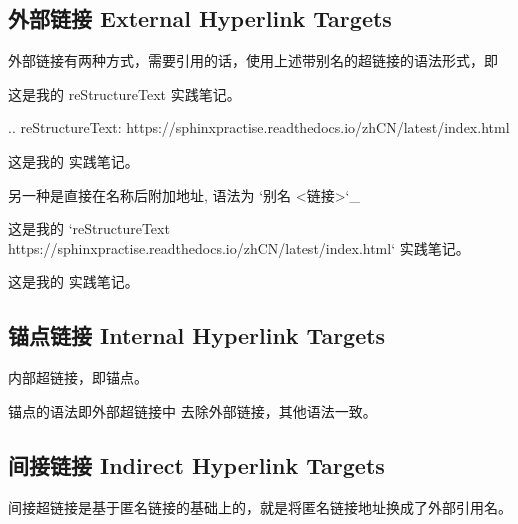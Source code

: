 \documentclass[a4paper,10pt,english]{sphinxmanual}
\begin{document}
\subsection{外部链接 External Hyperlink Targets}
\label{\detokenize{reStructureText_syntax:external-hyperlink-targets}}
\sphinxAtStartPar
外部链接有两种方式，需要引用的话，使用上述带别名的超链接的语法形式，即

\sphinxAtStartPar
{}

\begin{sphinxVerbatim}[commandchars=\\\{\}]
这是我的 reStructureText\PYGZus{} 实践笔记。

.. \PYGZus{}reStructureText: https://sphinx\PYGZhy{}practise.readthedocs.io/zh\PYGZus{}CN/latest/index.html
\end{sphinxVerbatim}

\sphinxAtStartPar
{}

\sphinxAtStartPar
这是我的  实践笔记。

\sphinxAtStartPar
另一种是直接在名称后附加地址, 语法为 `别名 <链接>`\_

\sphinxAtStartPar
{}

\begin{sphinxVerbatim}[commandchars=\\\{\}]
这是我的 `reStructureText \PYGZlt{}https://sphinx\PYGZhy{}practise.readthedocs.io/zh\PYGZus{}CN/latest/index.html\PYGZgt{}`\PYGZus{} 实践笔记。
\end{sphinxVerbatim}

\sphinxAtStartPar
{}

\sphinxAtStartPar
这是我的  实践笔记。


\subsection{锚点链接 Internal Hyperlink Targets}
\label{\detokenize{reStructureText_syntax:internal-hyperlink-targets}}
\sphinxAtStartPar
内部超链接，即锚点。

\sphinxAtStartPar
锚点的语法即外部超链接中 {\hyperref[\detokenize{reStructureText_syntax:id36}]{}} 去除外部链接，其他语法一致。


\subsection{间接链接 Indirect Hyperlink Targets}
\label{\detokenize{reStructureText_syntax:indirect-hyperlink-targets}}
\sphinxAtStartPar
间接超链接是基于匿名链接的基础上的，就是将匿名链接地址换成了外部引用名。
\end{document}
